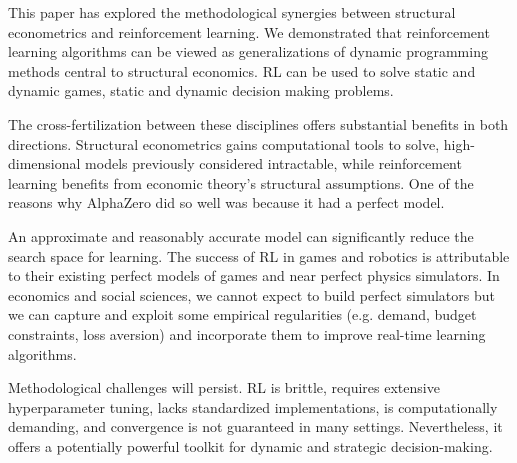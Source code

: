 This paper has explored the methodological synergies between structural econometrics and reinforcement learning. We demonstrated that reinforcement learning algorithms can be viewed as generalizations of dynamic programming methods central to structural economics. RL can be used to solve static and dynamic games, static and dynamic decision making problems.

The cross-fertilization between these disciplines offers substantial benefits in both directions. Structural econometrics gains computational tools to solve, high-dimensional models previously considered intractable, while reinforcement learning benefits from economic theory's structural assumptions. One of the reasons why AlphaZero did so well was because it had a perfect model. 

An approximate and reasonably accurate model can significantly reduce the search space for learning. The success of RL in games and robotics is attributable to their existing perfect models of games and near perfect physics simulators. In economics and social sciences, we cannot expect to build perfect simulators but we can capture and exploit some empirical regularities (e.g. demand, budget constraints, loss aversion) and incorporate them to improve real-time learning algorithms. 

Methodological challenges will persist. RL is brittle, requires extensive hyperparameter tuning, lacks standardized implementations, is computationally demanding, and convergence is not guaranteed in many settings. Nevertheless, it offers a potentially powerful toolkit for dynamic and strategic decision-making.